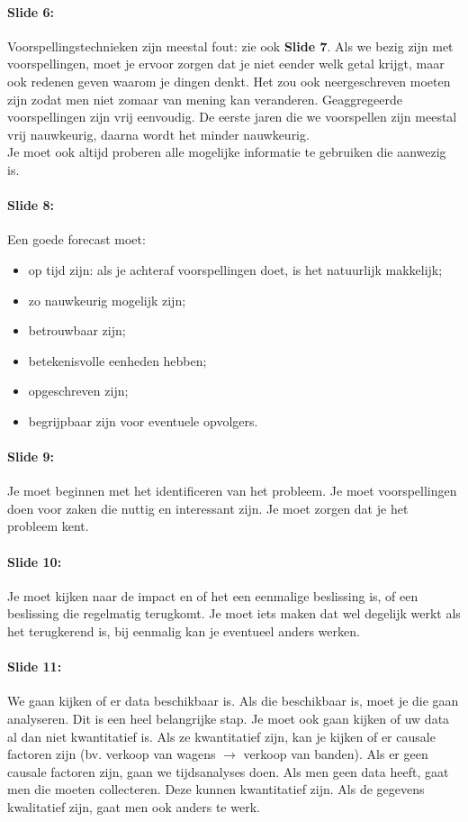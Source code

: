 \documentclass[10pt,a4paper]{report}
\begin{document}
\paragraph{Slide 6:} Voorspellingstechnieken zijn meestal fout: zie ook \textbf{Slide 7}. Als we bezig zijn met voorspellingen, moet je ervoor zorgen dat je niet eender welk getal krijgt, maar ook redenen geven waarom je dingen denkt. Het zou ook neergeschreven moeten zijn zodat men niet zomaar van mening kan veranderen. Geaggregeerde voorspellingen zijn vrij eenvoudig. De eerste jaren die we voorspellen zijn meestal vrij nauwkeurig, daarna wordt het minder nauwkeurig. \\
Je moet ook altijd proberen alle mogelijke informatie te gebruiken die aanwezig is. 

\paragraph{Slide 8:} Een goede forecast moet:
\begin{itemize}
\item op tijd zijn: als je achteraf voorspellingen doet, is het natuurlijk makkelijk;
\item zo nauwkeurig mogelijk zijn;
\item betrouwbaar zijn;
\item betekenisvolle eenheden hebben;
\item opgeschreven zijn;
\item begrijpbaar zijn voor eventuele opvolgers.
\end{itemize}

\paragraph{Slide 9:} Je moet beginnen met het identificeren van het probleem. Je moet voorspellingen doen voor zaken die nuttig en interessant zijn. Je moet zorgen dat je het probleem kent.

\paragraph{Slide 10:} Je moet kijken naar de impact en of het een eenmalige beslissing is, of een beslissing die regelmatig terugkomt. Je moet iets maken dat wel degelijk werkt als het terugkerend is, bij eenmalig kan je eventueel anders werken.

\paragraph{Slide 11:} We gaan kijken of er data beschikbaar is. Als die beschikbaar is, moet je die gaan analyseren. Dit is een heel belangrijke stap. Je moet ook gaan kijken of uw data al dan niet kwantitatief is. Als ze kwantitatief zijn, kan je kijken of er causale factoren zijn (bv. verkoop van wagens $\rightarrow$ verkoop van banden).
Als er geen causale factoren zijn, gaan we tijdsanalyses doen. Als men geen data heeft, gaat men die moeten collecteren. Deze kunnen kwantitatief zijn. Als de gegevens kwalitatief zijn, gaat men ook anders te werk.
\end{document}
